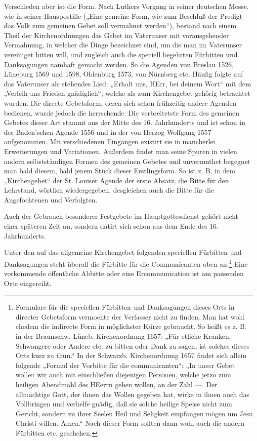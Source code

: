 Verschieden aber ist die Form. Nach Luthers Vorgang in seiner deutschen Messe, wie in seiner Hauspostille („Eine gemeine Form, wie zum Beschluß der
Predigt das Volk zum gemeinen Gebet soll vermahnet werden“), bestand nach einem Theil der Kirchenordnungen das Gebet im Vaterunser mit vorausgehender Vermahnung, in welcher die Dinge bezeichnet sind, um die man im Vaterunser vereiniget bitten will, und zugleich auch die speciell begehrten Fürbitten und Danksagungen namhaft gemacht werden. So die Agenden von Breslau 1526, Lüneburg 1569 und 1598, Oldenburg 1573, von Nürnberg etc. Häufig folgte auf das Vaterunser als stehendes Lied: „Erhalt uns, HErr, bei deinem Wort“ mit dem „Verleih uns Frieden gnädiglich“, welche als zum Kirchengebet gehörig betrachtet wurden. Die directe Gebetsform, deren sich schon frühzeitig andere Agenden bedienen, wurde jedoch die herrschende. Die verbreitetste Form des gemeinen Gebetes dieser Art stammt aus der Mitte des 16. Jahrhunderts und ist schon in der Baden’schen Agende 1556 und in der von Herzog Wolfgang 1557 aufgenommen. Mit verschiedenen Eingängen existirt sie in mancherlei Erweiterungen und Variationen. Außerdem findet man seine Spuren in vielen andern selbstständigen Formen des gemeinen Gebetes und unvermuthet begegnet man bald diesem, bald jenem Stück dieser Erstlingsform. So ist z. B. in dem „Kirchengebet“ der St. Louiser Agende der erste Absatz, die Bitte für den Lehrstand, wörtlich wiedergegeben, desgleichen auch die Bitte für die Angefochtenen und Verfolgten.

Auch der Gebrauch besonderer Festgebete im Hauptgottesdienst gehört nicht einer späteren Zeit an, sondern datirt sich schon aus dem Ende des 16. Jahrhunderts.

Unter den auf das allgemeine Kirchengebet folgenden speciellen Fürbitten und Danksagungen steht überall die Fürbitte für die Communicanten oben an.\footnote{Formulare für die speciellen Fürbitten und Danksagungen dieses Orts in directer Gebetsform vermochte der Verfasser nicht zu finden. Man hat wohl ehedem die indirecte Form in möglichster Kürze gebraucht. So heißt es z. B. in der Braunschw.-Lüneb. Kirchenordnung 1657: „Für etliche Kranken, Schwangere oder Andere etc. zu bitten oder Dank zu sagen, ist solches dieses Orts kurz zu thun.“ In der Schwarzb. Kirchenordnung 1657 findet sich allein folgende „Formul der Vorbitte für die communicanten“: „In unser Gebet wollen wir auch mit einschließen diejenigen Personen, welche jetzo zum heiligen Abendmahl des HEerrn gehen wollen, an der Zahl —. Der allmächtige Gott, der ihnen das Wollen gegeben hat, wirke in ihnen auch das Vollbringen und verhelfe gnädig, daß sie solche heilige Speise nicht zum Gericht, sondern zu ihrer Seelen Heil und Seligkeit empfangen mögen um Jesu Christi willen. Amen.“ Nach dieser Form sollten dann wohl auch die andern Fürbitten etc. geschehen.} Eine vorkommende öffentliche Abbitte oder eine Ercommunication ist am passenden Orte eingereiht.

